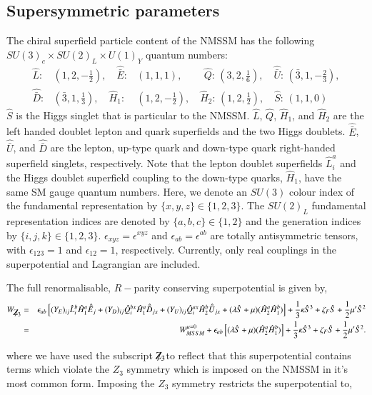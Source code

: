 \documentclass[final,3p,times,pdflatex]{elsarticle}
\newcommand{\ba}{\begin{eqnarray}}
\newcommand{\ea}{\end{eqnarray}}
\newcommand{\Zv}{{\mbox{${\not\!\!Z_3}$}}}
\begin{document}
\subsection{Supersymmetric parameters \label{susypars}}
The chiral superfield particle content of the NMSSM has the 
following $SU(3)_c\times SU(2)_L\times U(1)_Y$ quantum numbers:
\begin{eqnarray}
\hat{L}:&(1,2,-\frac{1}{2}),\quad \hat{{\bar E}}:&(1,1,1),\qquad\, \hat{Q}:\,(3,2,\frac{1}{6}),\quad
\hat{{\bar U}}:\,(\bar 3,1,-\frac{2}{3}),\nonumber\\ \hat{{\bar D}}:&(\bar 3,1,\frac{1}{3}),\quad
\hat{H}_1:&(1,2,-\frac{1}{2}),\quad \hat{H}_2:\,(1,2,\frac{1}{2}),\quad \hat{S}:\,(1,1,0)
\label{fields}
\end{eqnarray}
$\hat S$ is the Higgs singlet that is particular to the NMSSM.
$\hat L$, $\hat Q$, $\hat H_1$, and $\hat H_2$ are the left handed doublet lepton and
quark superfields and the two Higgs doublets. $\hat{\bar E}$, $\hat{\bar U}$, and
$\hat{\bar D}$ are the lepton, up-type quark and down-type quark
right-handed superfield singlets, respectively. 
Note that the lepton
doublet superfields $\hat{L}^a_i$ and the Higgs doublet superfield coupling
to the down-type quarks, $\hat{H}_1$, have the same SM gauge 
quantum numbers. 
Here, we denote an $SU(3)$ colour index of the fundamental
representation by  $\{x,y,z\} \in \{1,2,3 \}$. The $SU(2)_L$ fundamental
representation indices are denoted by $\{a,b,c\} \in \{1,2\}$ and the generation
indices by $\{i,j,k\} \in \{1,2,3\}$. 
$\epsilon_{xyz}=\epsilon^{xyz}$ and  $\epsilon_{ab}=\epsilon^{ab}$ are totally
antisymmetric tensors, with $\epsilon_{123}=1$ and $\epsilon_{12}=1$,
respectively.  Currently, only real couplings in the superpotential and Lagrangian are included. 

The full renormalisable, $R-$parity conserving superpotential is given by,
\ba 
 W_{\Zv}  &=&  \epsilon_{ab} \left[ (Y_E)_{ij} \hat L_i^b
\hat H_1^a \hat{\bar E}_j + (Y_D)_{ij} \hat Q_i^{bx} \hat H_1^a \hat{\bar D}_{jx} +
(Y_U)_{ij} \hat Q_i^{ax} \hat H_2^b \hat{\bar U}_{jx} 
+(\lambda \hat{S} + \mu)(\hat{H}^a_2 \hat{H}^b_1) \right ] +\frac{1}{3}\kappa\hat{S}^3 + \zeta_F\hat{S} + \frac{1}{2} \mu^\prime\hat{S}^2 \\
 &=& W_{MSSM}^{\mu =0}  +  \epsilon_{ab}\left [(\lambda \hat{S} + \mu)(\hat{H}^a_2 \hat{H}^b_1) \right ]+\frac{1}{3}\kappa\hat{S}^3 + \zeta_F\hat{S} + \frac{1}{2} \mu^\prime\hat{S}^2. 
\label{eq:WZ3V}
\ea
 
\noindent where we have used the subscript \Zv to reflect that this superpotential contains terms which violate the $Z_3$ symmetry which is imposed on the NMSSM in it's most common form.  Imposing the $Z_3$ symmetry restricts the superpotential to,
\end{document}
